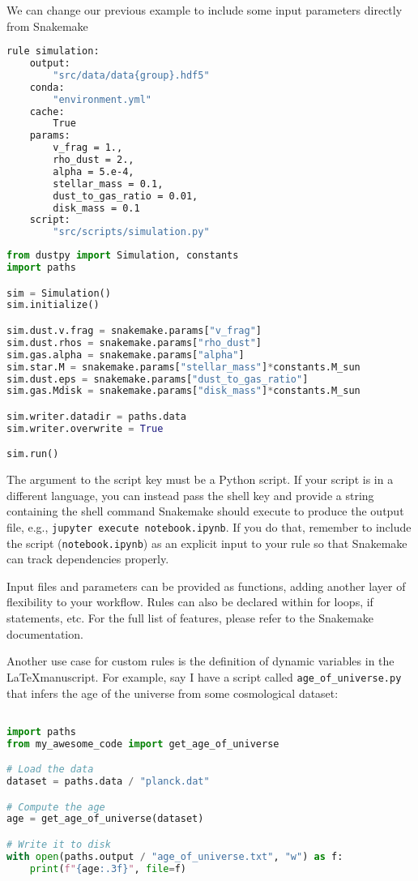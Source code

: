 \documentclass{aa}
\begin{document}
We can change our previous example to include some input parameters directly from Snakemake
\begin{lstlisting}[language=bash, caption=Snakemake DustPy]
rule simulation:
    output:
        "src/data/data{group}.hdf5"
    conda:
        "environment.yml"
    cache:
        True
    params:
        v_frag = 1.,
        rho_dust = 2.,
        alpha = 5.e-4,
        stellar_mass = 0.1,
        dust_to_gas_ratio = 0.01,
        disk_mass = 0.1
    script:
        "src/scripts/simulation.py"
\end{lstlisting}
\begin{lstlisting}[language=python, caption=simulations.py]
from dustpy import Simulation, constants
import paths

sim = Simulation()
sim.initialize()

sim.dust.v.frag = snakemake.params["v_frag"]
sim.dust.rhos = snakemake.params["rho_dust"]
sim.gas.alpha = snakemake.params["alpha"]
sim.star.M = snakemake.params["stellar_mass"]*constants.M_sun
sim.dust.eps = snakemake.params["dust_to_gas_ratio"]
sim.gas.Mdisk = snakemake.params["disk_mass"]*constants.M_sun

sim.writer.datadir = paths.data
sim.writer.overwrite = True

sim.run()
\end{lstlisting}

The argument to the script key must be a Python script. If your script is in a different language, you can instead pass the shell key and provide a string containing the shell command Snakemake should execute to produce the output file, e.g., \texttt{jupyter execute notebook.ipynb}.
If you do that, remember to include the script (\texttt{notebook.ipynb}) as an explicit input to your rule so that Snakemake can track dependencies properly.

Input files and parameters can be provided as functions, adding another layer of flexibility to your workflow. Rules can also be declared within for loops, if statements, etc. For the full list of features, please refer to the Snakemake documentation.

Another use case for custom rules is the definition of dynamic variables in the \LaTeX manuscript.
For example, say I have a script called \texttt{age\_of\_universe.py} that infers the age of the universe from some cosmological dataset:

\begin{lstlisting}[language=python, caption=Python age of universe]

import paths
from my_awesome_code import get_age_of_universe

# Load the data
dataset = paths.data / "planck.dat"

# Compute the age
age = get_age_of_universe(dataset)

# Write it to disk
with open(paths.output / "age_of_universe.txt", "w") as f:
    print(f"{age:.3f}", file=f)
\end{lstlisting}
\end{document}
